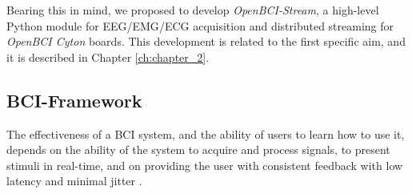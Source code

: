 Bearing this in mind, we proposed to develop \textit{OpenBCI-Stream}, a high-level Python module for \gls*{EEG}/\gls*{EMG}/\gls*{ECG} acquisition and distributed streaming for \textit{OpenBCI Cyton} boards. This development is related to the first specific aim, and it is described in Chapter \ref{ch:chapter_2}.


\subsection{\gls*{BCI}-Framework}

The effectiveness of a BCI system, and the ability of users to learn how to use it, depends on the ability of the system to acquire and process signals, to present stimuli in real-time, and on providing the user with consistent feedback with low latency and minimal jitter \cite{wilson2010procedure}.











